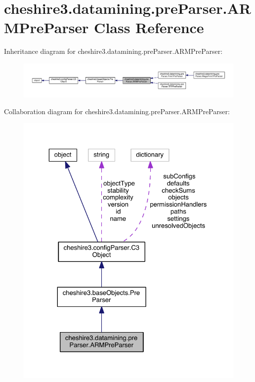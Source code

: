 \hypertarget{classcheshire3_1_1datamining_1_1pre_parser_1_1_a_r_m_pre_parser}{\section{cheshire3.\-datamining.\-pre\-Parser.\-A\-R\-M\-Pre\-Parser Class Reference}
\label{classcheshire3_1_1datamining_1_1pre_parser_1_1_a_r_m_pre_parser}
}


Inheritance diagram for cheshire3.\-datamining.\-pre\-Parser.\-A\-R\-M\-Pre\-Parser\-:
\nopagebreak
\begin{figure}[H]
\begin{center}
\leavevmode
\includegraphics[width=350pt]{classcheshire3_1_1datamining_1_1pre_parser_1_1_a_r_m_pre_parser__inherit__graph}
\end{center}
\end{figure}


Collaboration diagram for cheshire3.\-datamining.\-pre\-Parser.\-A\-R\-M\-Pre\-Parser\-:
\nopagebreak
\begin{figure}[H]
\begin{center}
\leavevmode
\includegraphics[width=325pt]{classcheshire3_1_1datamining_1_1pre_parser_1_1_a_r_m_pre_parser__coll__graph}
\end{center}
\end{figure}
